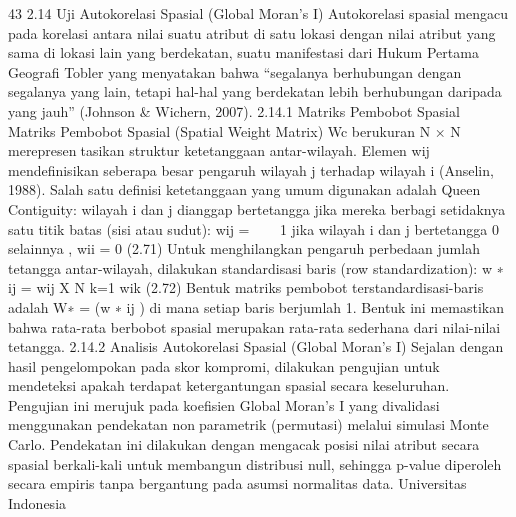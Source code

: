 43
2.14 Uji Autokorelasi Spasial (Global Moran’s I)
Autokorelasi spasial mengacu pada korelasi antara nilai suatu atribut di satu lokasi
dengan nilai atribut yang sama di lokasi lain yang berdekatan, suatu manifestasi dari
Hukum Pertama Geografi Tobler yang menyatakan bahwa “segalanya berhubungan dengan
segalanya yang lain, tetapi hal-hal yang berdekatan lebih berhubungan daripada yang jauh”
(Johnson & Wichern, 2007).
2.14.1 Matriks Pembobot Spasial
Matriks Pembobot Spasial (Spatial Weight Matrix) Wc berukuran N × N merepresentasikan struktur ketetanggaan antar-wilayah. Elemen wij mendefinisikan seberapa besar
pengaruh wilayah j terhadap wilayah i (Anselin, 1988). Salah satu definisi ketetanggaan
yang umum digunakan adalah Queen Contiguity: wilayah i dan j dianggap bertetangga
jika mereka berbagi setidaknya satu titik batas (sisi atau sudut):
wij =



1 jika wilayah i dan j bertetangga
0 selainnya
, wii = 0 (2.71)
Untuk menghilangkan pengaruh perbedaan jumlah tetangga antar-wilayah, dilakukan
standardisasi baris (row standardization):
w
∗
ij =
wij
X
N
k=1
wik
(2.72)
Bentuk matriks pembobot terstandardisasi-baris adalah W∗ = (w
∗
ij ) di mana setiap baris
berjumlah 1. Bentuk ini memastikan bahwa rata-rata berbobot spasial merupakan rata-rata
sederhana dari nilai-nilai tetangga.
2.14.2 Analisis Autokorelasi Spasial (Global Moran’s I)
Sejalan dengan hasil pengelompokan pada skor kompromi, dilakukan pengujian untuk
mendeteksi apakah terdapat ketergantungan spasial secara keseluruhan. Pengujian ini
merujuk pada koefisien Global Moran’s I yang divalidasi menggunakan pendekatan nonparametrik (permutasi) melalui simulasi Monte Carlo. Pendekatan ini dilakukan dengan
mengacak posisi nilai atribut secara spasial berkali-kali untuk membangun distribusi null,
sehingga p-value diperoleh secara empiris tanpa bergantung pada asumsi normalitas data.
Universitas Indonesia


